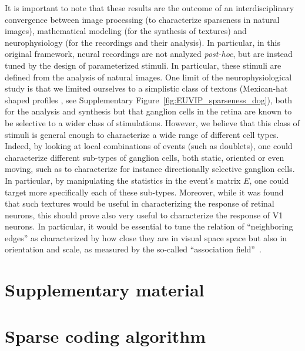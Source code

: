 \documentclass{article}
\begin{document}
It is important to note that these results are the outcome of an interdisciplinary convergence between image processing (to characterize sparseness in natural images), mathematical modeling (for the synthesis of textures) and neurophysiology (for the recordings and their analysis). In particular, in this original framework, neural recordings are not analyzed \emph{post-hoc}, but are instead tuned by the design of parameterized stimuli. In particular, these stimuli are defined from the analysis of natural images. One limit of the neurophysiological study is that we limited ourselves to a simplistic class of textons (Mexican-hat shaped profiles\if{} , see Supplementary Figure~\ref{fig:EUVIP_sparseness_dog}\fi), both for the analysis and synthesis but that ganglion cells in the retina are known to be selective to a wider class of stimulations. However, we believe that this class of stimuli is general enough to characterize a wide range of different cell types. Indeed, by looking at local combinations of events (such as doublets), one could characterize different sub-types of ganglion cells, both static, oriented or even moving, such as to characterize for instance directionally selective ganglion cells. In particular, by manipulating the statistics in the event's matrix $E$, one could target more specifically each of these sub-types. Moreover, while it  was found that such textures would be useful in characterizing the response of retinal neurons, this should prove also very useful to characterize the response of V1 neurons. In particular, it would be essential to tune the relation of ``neighboring edges'' as characterized by how close they are in visual space space but also in orientation and scale, as measured by the so-called ``association field''~\citep{PerrinetBednar15}.

\if{}
\newpage
\section{Supplementary material}
\section{Sparse coding algorithm}
\label{sec:sparse} %
\end{document}
